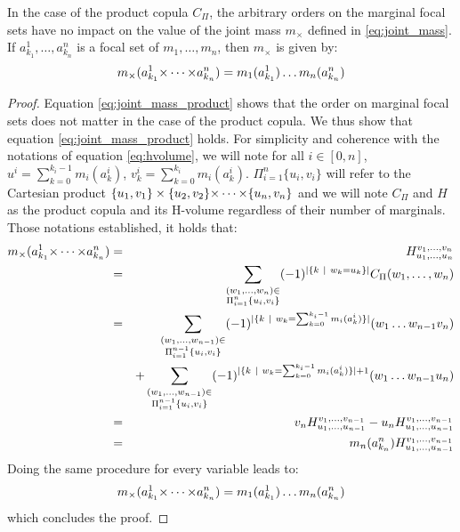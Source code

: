 
In the case of the product copula $C_\Pi$, the arbitrary orders on the marginal focal sets have no impact on the value of the joint mass $m_\times$ defined in \ref{eq:joint_mass}. If $a^1_{k_1},\dots,a^n_{k_n}$ is a focal set of $m_1,\dots,m_n$, then $m_\times$ is given by:
\begin{eqnarray}\label{eq:joint_mass_product}
    m_\times(a^1_{k_1}{\times\dots\times} a^n_{k_n}) = m_1(a^1_{k_1})\dots m_n(a^n_{k_n})
\end{eqnarray}

\begin{proof}
    Equation \ref{eq:joint_mass_product} shows that the order on marginal focal sets does not matter in the case of the product copula. We thus show that equation \ref{eq:joint_mass_product} holds.
    For simplicity and coherence with the notations of equation \ref{eq:hvolume}, we will note for all $i\in[0,n]$, $u^i=\sum_{k=0}^{k_i-1}m_i(a_k^i)$, $v^i_k=\sum_{k=0}^{k_i}m_i(a_k^i)$. $\Pi_{i=1}^n\{u_i, v_i\}$ will refer to the Cartesian product $\{u_1, v_1\}\times\{u_2, v_2\}{\times\dots\times}\{u_n, v_n\}$ and we will note $C_\Pi$ and $H$ as the product copula and its H-volume regardless of their number of marginals. Those notations established, it holds that:
    \begin{eqnarray*}
        m_\times(a^1_{k_1}{\times\dots\times} a^{n}_{k_{n}}) &=& H_{u_1, \dots, u_{n}}^{v_1, \dots, v_{n}}\\
        &=&\sum_{\substack{(w_1, \dots, w_{n})\in\\\Pi_{i=1}^{n}\{u_i, v_i\}}}(-1)^{|\{k~|~w_k=u_k\}|}C_\Pi(w_1, \dots, w_{n})\\
        &=&\sum_{\substack{(w_1, \dots, w_{n-1})\in\\\Pi_{i=1}^{n-1}\{u_i, v_i\}}}(-1)^{|\{k~|~w_k=\sum_{k=0}^{k_i-1}m_i(a^i_k)\}|}(w_1 \dots w_{n-1}v_{n})\\
        && + \sum_{\substack{(w_1, \dots, w_{n-1})\in\\\Pi_{i=1}^{n-1}\{u_i, v_i\}}}(-1)^{|\{k~|~w_k=\sum_{k=0}^{k_i-1}m_i(a^i_k)\}|+1}(w_1 \dots w_{n-1}u_n)\\
        &=& v_{n}H_{u_1, \dots, u_{n-1}}^{v_1, \dots, v_{n-1}} - u_{n}H_{u_1, \dots, u_{n-1}}^{v_1, \dots, v_{n-1}}\\
        &=& m_{n}(a^{n}_{k_{n}})H_{u_1, \dots, u_{n-1}}^{v_1, \dots, v_{n-1}}
    \end{eqnarray*}
    Doing the same procedure for every variable leads to:
    \begin{eqnarray*}
        m_\times(a^1_{k_1}{\times\dots\times} a^n_{k_n}) = m_1(a^1_{k_1})\dots m_n(a^n_{k_n})
    \end{eqnarray*}
    which concludes the proof.
\end{proof}

